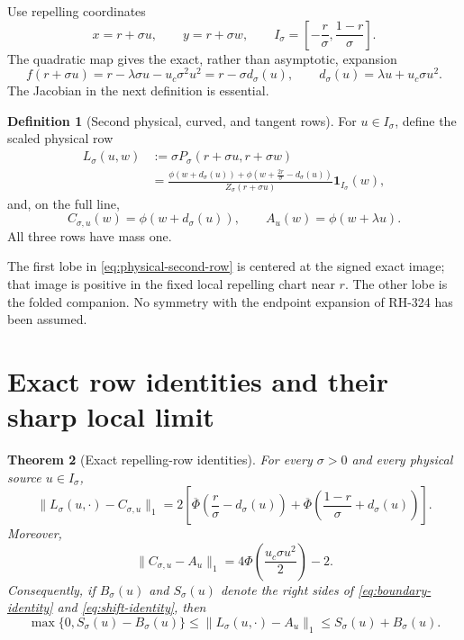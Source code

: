 \documentclass[11pt]{article}
\newtheorem{theorem}{Theorem}[section]
\theoremstyle{definition}
\newtheorem{definition}[theorem]{Definition}
\theoremstyle{remark}
\newcommand{\1}{\mathbf 1}
\begin{document}
Use repelling coordinates
\begin{equation}\label{eq:repelling-coordinates}
 x=r+\sigma u,
 \qquad y=r+\sigma w,
 \qquad
 I_\sigma=\left[-\frac r\sigma,\frac{1-r}\sigma\right].
\end{equation}
The quadratic map gives the exact, rather than asymptotic, expansion
\begin{equation}\label{eq:repelling-expansion}
 f(r+\sigma u)=r-\lambda\sigma u-u_c\sigma^2u^2
 =r-\sigma d_\sigma(u),
 \qquad
 d_\sigma(u)=\lambda u+u_c\sigma u^2.
\end{equation}
The Jacobian in the next definition is essential.

\begin{definition}[Second physical, curved, and tangent rows]
For $u\in I_\sigma$, define the scaled physical row
\begin{align}
 L_\sigma(u,w)
 &:=\sigma P_\sigma(r+\sigma u,r+\sigma w)\nonumber\\
 &=\frac{
 \phi(w+d_\sigma(u))
 +\phi\!\left(w+\frac{2r}\sigma-d_\sigma(u)\right)}
 {Z_\sigma(r+\sigma u)}\1_{I_\sigma}(w),
 \label{eq:physical-second-row}
\end{align}
and, on the full line,
\begin{equation}\label{eq:curved-tangent-rows}
 C_{\sigma,u}(w)=\phi(w+d_\sigma(u)),
 \qquad
 A_u(w)=\phi(w+\lambda u).
\end{equation}
All three rows have mass one.
\end{definition}

The first lobe in \eqref{eq:physical-second-row} is centered at the signed
exact image; that image is positive in the fixed local repelling chart near
$r$.  The other lobe is the folded companion.  No symmetry with the endpoint
expansion of RH-324 has been assumed.

\section{Exact row identities and their sharp local limit}

\begin{theorem}[Exact repelling-row identities]\label{thm:row-identities}
For every $\sigma>0$ and every physical source $u\in I_\sigma$,
\begin{equation}\label{eq:boundary-identity}
 \boxed{
 \|L_\sigma(u,\cdot)-C_{\sigma,u}\|_1
 =2\left[
 \overline\Phi\!\left(\frac r\sigma-d_\sigma(u)\right)
 +\overline\Phi\!\left(\frac{1-r}\sigma+d_\sigma(u)\right)
 \right].}
\end{equation}
Moreover,
\begin{equation}\label{eq:shift-identity}
 \boxed{
 \|C_{\sigma,u}-A_u\|_1
 =4\Phi\!\left(\frac{u_c\sigma u^2}{2}\right)-2.}
\end{equation}
Consequently, if $B_\sigma(u)$ and $S_\sigma(u)$ denote the right sides of
\eqref{eq:boundary-identity} and \eqref{eq:shift-identity}, then
\begin{equation}\label{eq:triangle-sandwich}
 \max\{0,S_\sigma(u)-B_\sigma(u)\}
 \le \|L_\sigma(u,\cdot)-A_u\|_1
 \le S_\sigma(u)+B_\sigma(u).
\end{equation}
\end{theorem}
\end{document}
